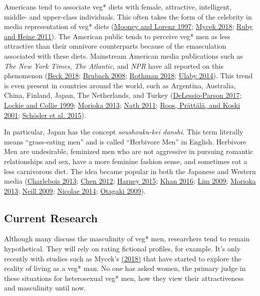 \documentclass[twoside]{report}
\begin{document}
\begin{multicols*}{2}
Americans tend to associate veg* diets with female, attractive,
intelligent, middle- and upper-class individuals. This often takes the
form of the celebrity in media representation of veg* diets (\hyperlink{mooney}{Mooney and
Lorenz 1997}; \hyperlink{mycek}{Mycek 2018}; \hyperlink{ruby}{Ruby and Heine 2011}). The American public
tends to perceive veg* men as less attractive than their omnivore
counterparts because of the emasculation associated with these diets.
Mainstream American media publications such as \emph{The New York
Times}, \emph{The Atlantic}, and \emph{NPR} have all reported on this
phenomenon (\hyperlink{beck}{Beck 2018}; \hyperlink{brubach}{Brubach 2008}; \hyperlink{rothman}{Rothman 2018}; \hyperlink{ulaby}{Ulaby 2014}). This trend is even present in countries around the world, such as Argentina, Australia,
China, Finland, Japan, The Netherlands, and Turkey (\hyperlink{delassio-parson}{DeLessio-Parson
2017}; \hyperlink{lockie}{Lockie and Collie 1999}; \hyperlink{morioka}{Morioka 2013}; \hyperlink{nath}{Nath 2011}; \hyperlink{roos}{Roos, Prättälä,
and Koski 2001}; \hyperlink{schosler}{Schösler et al. 2015}). 

In particular, Japan has the concept \emph{soushouku-kei danshi}. This term literally means ``grass-eating men'' and is called ``Herbivore Men'' in English. Herbivore Men are undesirable, feminized men who are not aggressive in pursuing romantic relationships and sex, have a more feminine fashion
sense, and sometimes eat a less carnivorous diet. The idea became
popular in both the Japanese and Western media (\hyperlink{charlebois}{Charlebois 2013}; \hyperlink{chen}{Chen 2012}; \hyperlink{harney}{Harney 2015}; \hyperlink{khan}{Khan 2016}; \hyperlink{lim}{Lim 2009}; \hyperlink{morioka}{Morioka 2013}; \hyperlink{neill}{Neill 2009}; \hyperlink{nicolae}{Nicolae 2014}; \hyperlink{otagaki}{Otagaki 2009}).

\subsection{Current Research}

Although many discuss the masculinity of veg* men, researchers tend to
remain hypothetical. They will rely on rating fictional profiles, for
example. It's only recently with studies such as Mycek's \hyperlink{mycek}{(2018)} that have started to explore the reality of living as a veg* man. No one has asked women, the primary judge in these situations for heterosexual veg* men, how they view their attractiveness and masculinity until now.


\end{multicols*}
\end{document}
